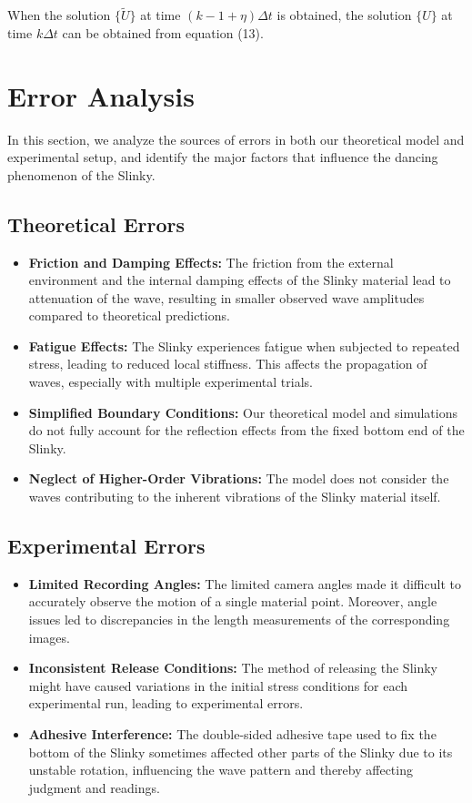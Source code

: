 \documentclass{mcmthesis}  %
\begin{document}
When the solution $\{\tilde{U}\}$ at time $(k - 1 + \eta)\Delta t$ is obtained, the solution $\{U\}$ at time $k\Delta t$ can be obtained from equation (13).

\section{Error Analysis}
In this section, we analyze the sources of errors in both our theoretical model and experimental setup, and identify the major factors that influence the dancing phenomenon of the Slinky.

\subsection{Theoretical Errors}
\begin{itemize}
    \item \textbf{Friction and Damping Effects:} The friction from the external environment and the internal damping effects of the Slinky material lead to attenuation of the wave, resulting in smaller observed wave amplitudes compared to theoretical predictions.
    
    \item \textbf{Fatigue Effects:} The Slinky experiences fatigue when subjected to repeated stress, leading to reduced local stiffness. This affects the propagation of waves, especially with multiple experimental trials.
    
    \item \textbf{Simplified Boundary Conditions:} Our theoretical model and simulations do not fully account for the reflection effects from the fixed bottom end of the Slinky.
    
    \item \textbf{Neglect of Higher-Order Vibrations:} The model does not consider the waves contributing to the inherent vibrations of the Slinky material itself.
\end{itemize}

\subsection{Experimental Errors}
\begin{itemize}
    \item \textbf{Limited Recording Angles:} The limited camera angles made it difficult to accurately observe the motion of a single material point. Moreover, angle issues led to discrepancies in the length measurements of the corresponding images.
    
    \item \textbf{Inconsistent Release Conditions:} The method of releasing the Slinky might have caused variations in the initial stress conditions for each experimental run, leading to experimental errors.
    
    \item \textbf{Adhesive Interference:} The double-sided adhesive tape used to fix the bottom of the Slinky sometimes affected other parts of the Slinky due to its unstable rotation, influencing the wave pattern and thereby affecting judgment and readings.
\end{itemize}
\end{document}
